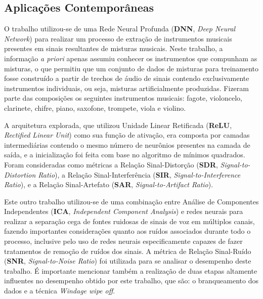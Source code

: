 







\subsection{Aplicações Contemporâneas}
\label{subsec:contemp_app}

O trabalho \citep{7178348} utilizou-se de uma Rede Neural Profunda (\textbf{DNN}, \textit{Deep Neural Network}) para realizar um processo de extração de instrumentos musicais presentes em sinais resultantes de misturas musicais. Neste trabalho, a informação \textit{a priori} apenas assumiu conhecer os instrumentos que compunham as misturas, o que permitiu que um conjunto de dados de misturas para treinamento fosse construído a partir de trechos de áudio de sinais contendo exclusivamente instrumentos individuais, ou seja, misturas artificialmente produzidas. Fizeram parte das composições os seguintes instrumentos musicais: fagote, violoncelo, clarinete, chifre, piano, saxofone, trompete, viola e violino.


A arquitetura explorada, que utilizou Unidade Linear Retificada (\textbf{ReLU}, \textit{Rectified Linear Unit}) \citep{nair2010rectified} como sua função de ativação, era composta por camadas intermediárias contendo o mesmo número de neurônios presentes na camada de saída, e a inicialização foi feita com base no algoritmo de mínimos quadrados. Foram consideradas como métricas a Relação Sinal-Distorção (\textbf{SDR}, \textit{Signal-to-Distortion Ratio}), a Relação Sinal-Interferência (\textbf{SIR}, \textit{Signal-to-Interference Ratio}), e a Relação Sinal-Artefato (\textbf{SAR}, \textit{Signal-to-Artifact Ratio}).


Este outro trabalho \citep{6245800} utilizou-se de uma combinação entre Análise de Componentes Independentes (\textbf{ICA}, \textit{Independent Component Analysis}) e redes neurais para realizar a separação cega de fontes ruidosas de sinais de voz em múltiplos canais, fazendo importantes considerações quanto aos ruídos associados durante todo o processo, inclusive pelo uso de redes neurais especificamente capazes de fazer tratamentos de remoção de ruídos dos sinais. A métrica de Relação Sinal-Ruído (\textbf{SNR}, \textit{Signal-to-Noise Ratio}) foi utilizada para se analisar o desempenho deste trabalho. É importante mencionar também a realização de duas etapas altamente influentes no desempenho obtido por este trabalho, que são: o branqueamento dos dados e a técnica \textit{Windage wipe off}.

